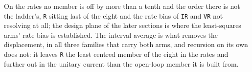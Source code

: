 On the rates no member is off by more than a tenth and the order there is not the ladder's,
\texttt{R} sitting last of the eight and the rate bias of \texttt{IR} and \texttt{VR} not resolving
at all; the design plane of the later sections is where the least-squares arms' rate bias is established.
The interval average is what
removes the displacement, in all three families that carry both arms, and recursion on its own does
not: it leaves \texttt{R} the least centred member of the eight in the rates and further out in the
unitary current than the open-loop member it is built from. %

